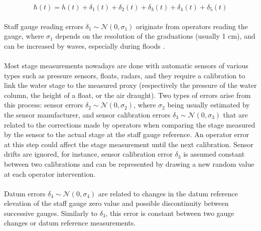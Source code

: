 \documentclass[11pt]{article}
\begin{document}
    \begin{equation}
        \hbar(t) = h(t) + \delta_1(t) + \delta_2(t) + \delta_3(t) + \delta_4(t) + \delta_5(t)
        \label{eq:StageError}
    \end{equation}

    \paragraph{}Staff gauge reading errors $\delta_1 \sim \mathcal{N}(0,\sigma_1)$ originate from operators reading the gauge, where $\sigma_1$ depends on the resolution of the graduations (usually 1 cm), and can be increased by waves, especially during floods \citep{mcmillan_benchmarking_2012}.

    \paragraph{}Most stage measurements nowadays are done with automatic sensors of various types such as pressure sensors, floats, radars, and they require a calibration to link the water stage to the measured proxy (respectively the pressure of the water column, the height of a float, or the air draught). Two types of errors arise from this process: sensor errors $\delta_2 \sim \mathcal{N}(0,\sigma_2)$, where $\sigma_2$ being usually estimated by the sensor manufacturer, and sensor calibration errors $\delta_3 \sim \mathcal{N}(0,\sigma_3)$ that are related to the corrections made by operators when comparing the stage measured by the sensor to the actual stage at the staff gauge reference. An operator error at this step could affect the stage measurement until the next calibration. Sensor drifts are ignored, for instance, sensor calibration error $\delta_3$ is assumed constant between two calibrations and can be represented by drawing a new random value at each operator intervention.
    
    \paragraph{}Datum errors $\delta_4  \sim \mathcal{N}(0,\sigma_4)$ are related to changes in the datum reference elevation of the staff gauge zero value and possible discontinuity between successive gauges. Similarly to $\delta_3$, this error is constant between two gauge changes or datum reference measurements. 
    
\end{document}
